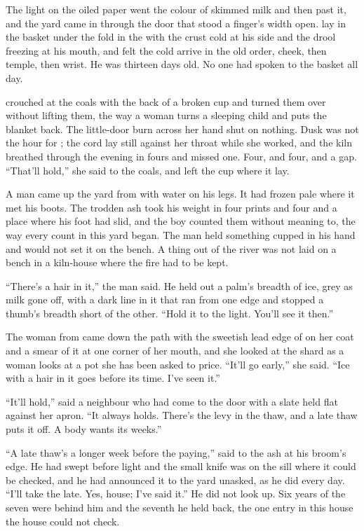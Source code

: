 
The light on the oiled paper went the colour of skimmed milk and then past it, and the yard came in through the door that stood a finger's width open.  lay in the basket under the fold in the  with the crust cold at his side and the drool freezing at his mouth, and felt the cold arrive in the old order, cheek, then temple, then wrist. He was thirteen days old. No one had spoken to the basket all day.

 crouched at the coals with the back of a broken cup and turned them over without lifting them, the way a woman turns a sleeping child and puts the blanket back. The little-door burn across her hand shut on nothing. Dusk was not the hour for ; the cord lay still against her throat while she worked, and the kiln breathed through the evening in fours and missed one. Four, and four, and a gap. “That'll hold,” she said to the coals, and left the cup where it lay.

A man came up the yard from  with water on his legs. It had frozen pale where it met his boots. The trodden ash took his weight in four prints and four and a place where his foot had slid, and the boy counted them without meaning to, the way every count in this yard began. The man held something cupped in his hand and would not set it on the bench. A thing out of the river was not laid on a bench in a kiln-house where the fire had to be kept.

“There's a hair in it,” the man said. He held out a palm's breadth of ice, grey as milk gone off, with a dark line in it that ran from one edge and stopped a thumb's breadth short of the other. “Hold it to the light. You'll see it then.”

The woman from  came down the path with the sweetish lead edge of  on her coat and a smear of it at one corner of her mouth, and she looked at the shard as a woman looks at a pot she has been asked to price. “It'll go early,” she said. “Ice with a hair in it goes before its time. I've seen it.”

“It'll hold,” said a neighbour who had come to the door with a slate held flat against her apron. “It always holds. There's the levy in the thaw, and a late thaw puts it off. A body wants its weeks.”

“A late thaw's a longer week before the paying,”  said to the ash at his broom's edge. He had swept before light and the small knife was on the sill where it could be checked, and he had announced it to the yard unasked, as he did every day. “I'll take the late. Yes, house; I've said it.” He did not look up. Six years of the seven were behind him and the seventh he held back, the one entry in this house the house could not check.

